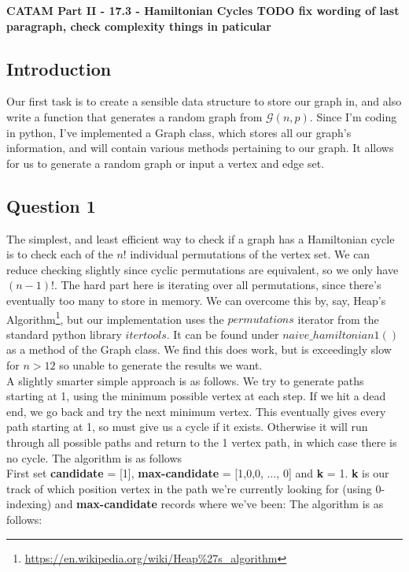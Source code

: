 \documentclass[10pt,a4paper]{report}
\begin{document}
\textbf{CATAM Part II - 17.3 - Hamiltonian Cycles TODO fix wording of last paragraph, check complexity things in paticular}
\thispagestyle{empty}

\newpage

\subsection*{Introduction}

Our first task is to create a sensible data structure to store our graph in, and also write a function that generates a random graph from $\mathcal{G}(n,p)$. Since I'm coding in python, I've implemented a Graph class, which stores all our graph's information, and will contain various methods pertaining to our graph. It allows for us to generate a random graph or input a vertex and edge set.

\subsection*{Question 1}	

The simplest, and least efficient way to check if a graph has a Hamiltonian cycle is to check each of the $n!$ individual permutations of the vertex set. We can reduce checking slightly since cyclic permutations are equivalent, so we only have $(n-1)!$. The hard part here is iterating over all permutations, since there's eventually too many to store in memory. We can overcome this by, say, Heap's Algorithm\footnote{\url{https://en.wikipedia.org/wiki/Heap\%27s_algorithm}}, but our implementation uses the $permutations$ iterator from the standard python library $itertools$.  It can be found under $naive\_hamiltonian1()$ as a method of the Graph class. We find this does work, but is exceedingly slow for $n>12$ so unable to generate the results we want. \\

A slightly smarter simple approach is as follows. We try to generate paths starting at 1, using the minimum possible vertex at each step. If we hit a dead end, we go back and try the next minimum vertex. This eventually gives every path starting at 1, so must give us a cycle if it exists. Otherwise it will run through all possible paths and return to the 1 vertex path, in which case there is no cycle. The algorithm is as follows\\
 
First set \textbf{candidate} = [1], \textbf{max-candidate} = [1,0,0, $\dots$, 0] and \textbf{k} = 1. \textbf{k} is our track of which position vertex in the path we're currently looking for (using 0-indexing) and \textbf{max-candidate} records where we've been: The algorithm is as follows: \\
\end{document}
